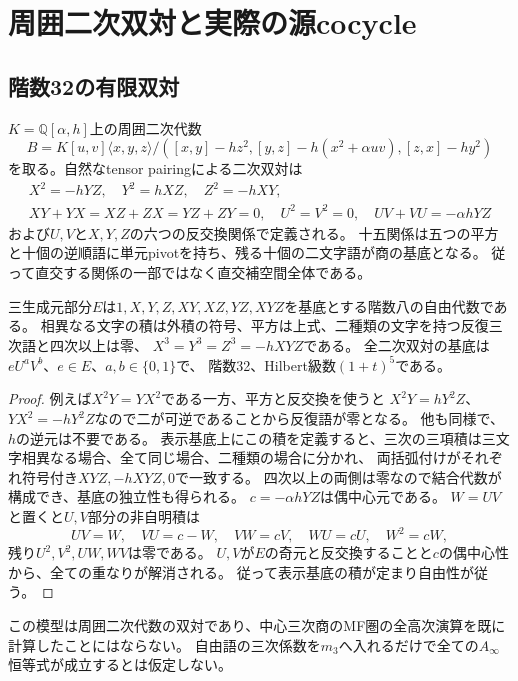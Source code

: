 \section{周囲二次双対と実際の源cocycle}
\subsection{階数32の有限双対}
$K=\mathbb Q[\alpha,h]$上の周囲二次代数
\[
 B=K[u,v]\langle x,y,z\rangle/([x,y]-hz^2,[y,z]-h(x^2+\alpha uv),[z,x]-hy^2)
\]
を取る。自然なtensor pairingによる二次双対は
\begin{gather*}
 X^2=-hYZ,\quad Y^2=hXZ,\quad Z^2=-hXY,\\
 XY+YX=XZ+ZX=YZ+ZY=0,\quad U^2=V^2=0,\quad UV+VU=-\alpha hYZ
\end{gather*}
および$U,V$と$X,Y,Z$の六つの反交換関係で定義される。
十五関係は五つの平方と十個の逆順語に単元pivotを持ち、残る十個の二文字語が商の基底となる。
従って直交する関係の一部ではなく直交補空間全体である。

\begin{proposition}
三生成元部分$E$は$1,X,Y,Z,XY,XZ,YZ,XYZ$を基底とする階数八の自由代数である。
相異なる文字の積は外積の符号、平方は上式、二種類の文字を持つ反復三次語と四次以上は零、
$X^3=Y^3=Z^3=-hXYZ$である。
全二次双対の基底は$eU^aV^b$、$e\in E$、$a,b\in\{0,1\}$で、
階数32、Hilbert級数$(1+t)^5$である。
\end{proposition}
\begin{proof}
例えば$X^2Y=YX^2$である一方、平方と反交換を使うと
$X^2Y=hY^2Z$、$YX^2=-hY^2Z$なので二が可逆であることから反復語が零となる。
他も同様で、$h$の逆元は不要である。
表示基底上にこの積を定義すると、三次の三項積は三文字相異なる場合、全て同じ場合、二種類の場合に分かれ、
両括弧付けがそれぞれ符号付き$XYZ,-hXYZ,0$で一致する。
四次以上の両側は零なので結合代数が構成でき、基底の独立性も得られる。
$c=-\alpha hYZ$は偶中心元である。
$W=UV$と置くと$U,V$部分の非自明積は
\[
 UV=W,\quad VU=c-W,\quad VW=cV,\quad WU=cU,\quad W^2=cW,
\]
残り$U^2,V^2,UW,WV$は零である。
$U,V$が$E$の奇元と反交換することと$c$の偶中心性から、全ての重なりが解消される。
従って表示基底の積が定まり自由性が従う。
\end{proof}
この模型は周囲二次代数の双対であり、中心三次商のMF圏の全高次演算を既に計算したことにはならない。
自由語の三次係数を$m_3$へ入れるだけで全ての$A_\infty$恒等式が成立するとは仮定しない。

